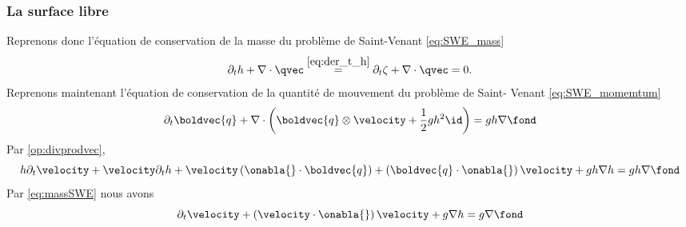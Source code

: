 \subsubsection{La surface libre}
\noindent Reprenons donc l'équation de conservation de la masse du problème de Saint-Venant \eqref{eq:SWE_mass}
\begin{equation}
	\partial_t h + \nabla\cdot \qvec \overset{\eqref{eq:der_t_h}}{=} \partial_t \zeta + \nabla \cdot\qvec = 0. \label{eq:massSWE}
\end{equation}
\noindent Reprenons maintenant l’équation de conservation de la quantité de mouvement du problème de Saint-
Venant \eqref{eq:SWE_momemtum}\\
\begin{equation}
	\partial_t \boldvec{q} + \nabla \cdot \left(\boldvec{q} \otimes\velocity + \frac{1}{2}gh^2\id\right) = gh\nabla\fond
\end{equation}
Par \eqref{op:divprodvec},
\begin{equation}
h \partial_t \velocity + \velocity \partial_t h + \velocity \left(\onabla{} \cdot \boldvec{q}\right) + \left(\boldvec{q}\cdot \onabla{}\right)\velocity + gh\nabla h= gh\nabla\fond
\end{equation}
Par \eqref{eq:massSWE} nous avons
\begin{equation}
\partial_t \velocity + \left(\velocity\cdot\onabla{}\right)\velocity + g\nabla h= g\nabla\fond
\end{equation}


